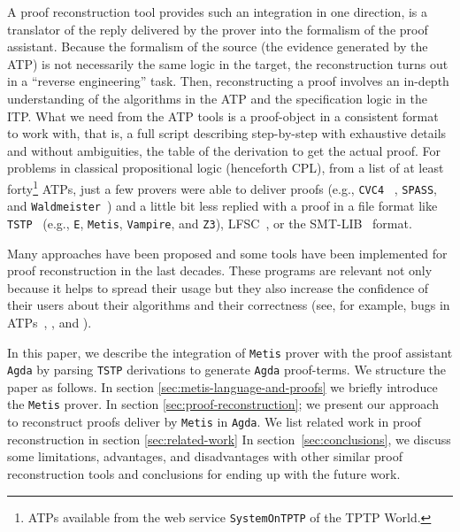 \documentclass[main.tex]{subfiles}
\begin{document}
A proof reconstruction tool provides such an integration in one direction,
is a translator of the reply delivered by the prover into the formalism of
the proof assistant. Because the formalism of the source (the evidence
generated by the ATP) is not necessarily the same logic in the target, the
reconstruction turns out in a ``reverse engineering'' task.
Then, reconstructing a proof involves an in-depth understanding of the
algorithms in the ATP and the specification logic in the ITP.
What we need from the ATP tools is a proof-object in a consistent format
to work with, that is, a full script describing step-by-step with
exhaustive details and without ambiguities, the table of the derivation
to get the actual proof. For problems in classical propositional logic
(henceforth CPL), from a list of at least forty\footnote{ATPs available
from the web service \texttt{SystemOnTPTP} of the TPTP World.} ATPs, just
a few provers were able to deliver proofs (e.g., \verb!CVC4!~
\cite{Barrett2011}, \verb!SPASS!, and
\verb!Waldmeister!~\cite{hillenbrand1997})
and a little bit less replied with a proof in a
file format like \verb!TSTP!~\cite{sutcliffe2004tstp} (e.g., \verb!E!, \verb!Metis!,
\verb!Vampire!, and \verb!Z3!), LFSC~\cite{Stump2008}, or the
SMT-LIB~\cite{Bohme2011} format.

Many approaches have been proposed and some tools have been implemented
for proof reconstruction in the last decades. These programs are relevant
not only because it helps to spread their usage but they also increase
the confidence of their users about their algorithms and their
correctness (see, for example, bugs in ATPs~\cite{Keller2013},
\cite{Bohme2011}, \cite{Fleury2014} and \cite{Kanso2012}).

In this paper, we describe the integration of \verb!Metis! prover with the
proof assistant \verb!Agda! by parsing \verb!TSTP! derivations to generate
\verb!Agda! proof-terms. We structure the paper as follows.
In section \ref{sec:metis-language-and-proofs} we briefly introduce
the \verb!Metis! prover. In section \ref{sec:proof-reconstruction}; we
present our approach to reconstruct proofs deliver by \verb!Metis! in
\verb!Agda!.
We list related work in proof reconstruction in section \ref{sec:related-work}
In section~\ref{sec:conclusions}, we discuss some limitations, advantages,
and disadvantages with other similar proof reconstruction tools and
conclusions for ending up with the future work.
\end{document}
